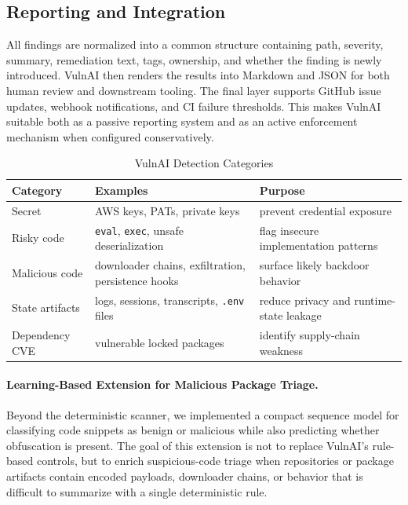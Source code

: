 \documentclass[conference]{IEEEtran}
\begin{document}
\subsection{Reporting and Integration}
All findings are normalized into a common structure containing path, severity, summary, remediation text, tags, ownership, and whether the finding is newly introduced. VulnAI then renders the results into Markdown and JSON for both human review and downstream tooling. The final layer supports GitHub issue updates, webhook notifications, and CI failure thresholds. This makes VulnAI suitable both as a passive reporting system and as an active enforcement mechanism when configured conservatively.

\begin{table}[htbp]
\caption{VulnAI Detection Categories}
\label{tab:categories}
\centering
\renewcommand{\arraystretch}{1.2}
\begin{tabular}{p{1.75cm}p{1.6cm}p{3.45cm}}
\toprule
\textbf{Category} & \textbf{Examples} & \textbf{Purpose} \\
\midrule
Secret & AWS keys, PATs, private keys & prevent credential exposure \\
Risky code & \texttt{eval}, \texttt{exec}, unsafe deserialization & flag insecure implementation patterns \\
Malicious code & downloader chains, exfiltration, persistence hooks & surface likely backdoor behavior \\
State artifacts & logs, sessions, transcripts, \texttt{.env} files & reduce privacy and runtime-state leakage \\
Dependency CVE & vulnerable locked packages & identify supply-chain weakness \\
\bottomrule
\end{tabular}
\end{table}

\paragraph{Learning-Based Extension for Malicious Package Triage.}
Beyond the deterministic scanner, we implemented a compact sequence model for classifying code snippets as benign or malicious while also predicting whether obfuscation is present. The goal of this extension is not to replace VulnAI's rule-based controls, but to enrich suspicious-code triage when repositories or package artifacts contain encoded payloads, downloader chains, or behavior that is difficult to summarize with a single deterministic rule.
\end{document}
